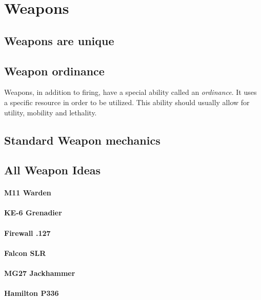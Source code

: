 \documentclass[../Main.tex]{subfiles}
\begin{document}
\section{Weapons}


\subsection{Weapons are unique}


\subsection{Weapon ordinance}

Weapons, in addition to firing, have a special ability called an \emph{ordinance}. It uses a specific resource in order to be utilized. This ability should usually allow for utility, mobility and lethality.

\subsection{Standard Weapon mechanics}


\subsection{All Weapon Ideas}


\paragraph{M11 Warden}


\paragraph{KE-6 Grenadier}
 

\paragraph{Firewall .127}


\paragraph{Falcon SLR}


\paragraph{MG27 Jackhammer}


\paragraph{Hamilton P336}
\end{document}
